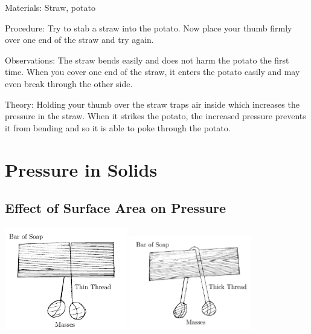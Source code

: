 \begin{multicols}{2}
\begin{description*}
\item[Materials:]{Straw, potato}
\item[Procedure:]{Try to stab a straw into the potato. Now place your thumb firmly over one end of the straw and try again.}
\item[Observations:]{The straw bends easily and does not harm the potato the first time. When you cover one end of the straw, it enters the potato easily and may even break through the other side.}
\item[Theory:]{Holding your thumb over the straw traps air inside which increases the pressure in the straw. When it strikes the potato, the increased pressure prevents it from bending and so it is able to poke through the potato.}
\end{description*}


\section*{Pressure in Solids}


\subsection{Effect of Surface Area on Pressure}

\begin{center}
\includegraphics[width=0.4\textwidth]{./img/pressure-solid1.png}
\includegraphics[width=0.4\textwidth]{./img/pressure-solid2.png}
\end{center}


\end{multicols}
